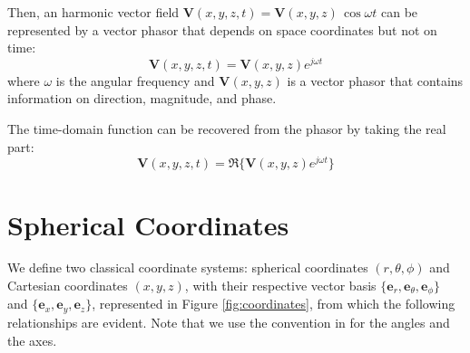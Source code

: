 Then, an harmonic vector field \( \mathbf{V}(x, y, z, t) = \mathbf{V}(x, y, z) 
\, \cos\omega t\) can be represented by a vector phasor that depends on space 
coordinates but not on time:
\[
\mathbf{V}(x, y, z, t) = \mathbf{V}(x, y, z) e^{j\omega t}
\]
where \(\omega\) is the angular frequency and \( \mathbf{V}(x, y, z) \) is a 
vector phasor that contains information on direction, magnitude, and phase.

The time-domain function can be recovered from the phasor by taking the real part:
\[
\mathbf{V}(x, y, z, t) = \Re\{ \mathbf{V}(x, y, z) e^{j\omega t} \}
\]

\section{Spherical Coordinates} \label{Spherical Coordinates}
We define two classical coordinate systems: spherical coordinates \((r, \theta, 
\phi)\) and Cartesian coordinates \((x, y, z)\), with their respective vector 
basis \( \{\mathbf{e}_r, \mathbf{e}_{\theta}, \mathbf{e}_{\phi} \} \) and 
\( \{\mathbf{e}_x, \mathbf{e}_y, \mathbf{e}_z\} \), represented in Figure 
\ref{fig:coordinates}, from which the following relationships are evident. Note 
that we use the convention in \cite{main} for the angles and the axes. 

